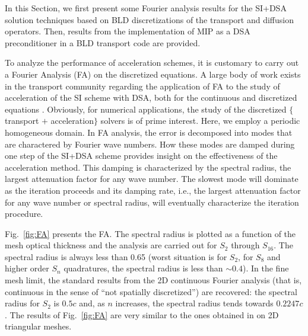\documentclass{mc2013}
\renewcommand{\(}{\left(}
\renewcommand{\)}{\right)}
\renewcommand{\[}{\left[}
\renewcommand{\]}{\right]}
\newcommand{\sn}{\ensuremath{S_n}\xspace}
\newcommand{\fig}[1]{Fig.~\ref{#1}}                      %
\begin{document}
 \label{sec:results}
In this Section, we first present some Fourier analysis results for the SI+DSA solution techniques
based on BLD discretizations of the transport and diffusion operators. Then, results from
the implementation of MIP as a DSA preconditioner in a BLD transport code are provided.

 \label{sec:fourier}
To analyze the performance of acceleration schemes, it is customary to carry out a Fourier Analysis (FA) on the discretized equations. A large body of work exists in the transport community regarding the application of FA to the study of acceleration of the SI scheme with DSA, both for the continuous and discretized equations \cite{consistent_p1}. Obviously, for numerical applications, the study of the discretized $\{$transport $+$ acceleration$\}$ solvers is of prime interest. Here, we employ a periodic homogeneous domain. In FA analysis, the error is decomposed into modes that are charactered by Fourier wave numbers. How these modes are damped during one step of the SI+DSA scheme provides insight on the effectiveness of the acceleration method. This damping is characterized by the spectral radius, the largest attenuation factor for any wave number. 
The slowest mode will dominate as the iteration proceeds and its damping rate, i.e., the largest attenuation factor for any wave number or spectral radius, will eventually characterize the iteration procedure.

\fig{fig:FA} presents the FA. The spectral radius is plotted as a function of the mesh optical thickness and the analysis are carried out for
$S_2$ through $S_{16}$. The spectral radius is always less than 0.65 (worst situation is for $S_2$, for $S_8$ and higher order \sn quadratures, the spectral radius is less than $\sim 0.4$). In the fine mesh limit, the standard results from the 2D continuous Fourier analysis (that is, continuous in the sense of ``not spatially discretized'') are recovered: the spectral radius for $S_2$ is $0.5c$ and, as $n$ increases, the spectral radius tends towards $0.2247c$. The results of \fig{fig:FA} are very similar to the ones obtained in \cite{mip} on 2D triangular meshes. 
\end{document}
